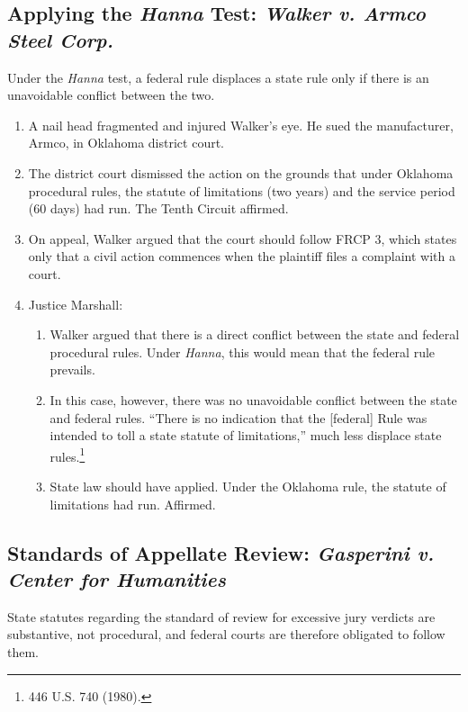 \subsection{Applying the \emph{Hanna} Test: \emph{Walker v. Armco Steel Corp.}}

Under the \emph{Hanna} test, a federal rule displaces a state rule only if 
there is an unavoidable conflict between the two.

\begin{enumerate}
    \item A nail head fragmented and injured Walker's eye. He sued the 
    manufacturer, Armco, in Oklahoma district court.
    \item The district court dismissed the action on the grounds that under 
    Oklahoma procedural rules, the statute of limitations (two years) and the 
    service period (60 days) had run. The Tenth Circuit affirmed.
    \item On appeal, Walker argued that the court should follow FRCP 3, which 
    states only that a civil action commences when the plaintiff files a 
    complaint with a court.
    \item Justice Marshall:
    \begin{enumerate}
        \item Walker argued that there is a direct conflict between the state 
        and federal procedural rules. Under \emph{Hanna}, this would mean that 
        the federal rule prevails.
        \item In this case, however, there was no unavoidable conflict between 
        the state and federal rules. ``There is no indication that the 
        [federal] Rule was intended to toll a state statute of limitations,'' 
        much less displace state rules.\footnote{446 U.S. 740 (1980).}
        \item State law should have applied. Under the Oklahoma rule, the 
        statute of limitations had run. Affirmed.
    \end{enumerate}
\end{enumerate}

\subsection{Standards of Appellate Review: \emph{Gasperini v. Center for 
Humanities}}

State statutes regarding the standard of review for excessive jury verdicts 
are substantive, not procedural, and federal courts are therefore obligated to 
follow them.

